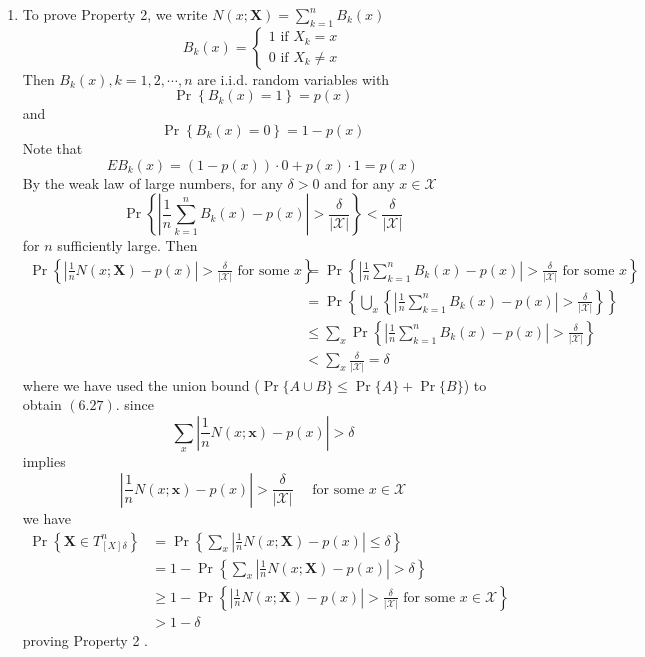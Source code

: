 \documentclass[8pt]{article}
\begin{document}
\begin{enumerate}
\item To prove Property 2, we write
$N(x ; \mathbf{X})=\sum_{k=1}^{n} B_{k}(x)$ 
$$B_{k}(x)=\left\{\begin{array}{l}1 \text { if } X_{k}=x \\ 0 \text { if } X_{k} \neq x\end{array}\right.$$
Then $B_{k}(x), k=1,2, \cdots, n$ are i.i.d. random variables with
$$
\operatorname{Pr}\left\{B_{k}(x)=1\right\}=p(x)
$$
and
$$
\operatorname{Pr}\left\{B_{k}(x)=0\right\}=1-p(x)
$$
Note that
$$
E B_{k}(x)=(1-p(x)) \cdot 0+p(x) \cdot 1=p(x)
$$
By the weak law of large numbers, for any $\delta>0$ and for any $x \in \mathcal{X}$
$$
\operatorname{Pr}\left\{\left|\frac{1}{n} \sum_{k=1}^{n} B_{k}(x)-p(x)\right|>\frac{\delta}{|\mathcal{X}|}\right\}<\frac{\delta}{|\mathcal{X}|}
$$
for $n$ sufficiently large. Then
$$
\begin{aligned}
	\operatorname{Pr}\left\{\left|\frac{1}{n} N(x ; \mathbf{X})-p(x)\right|>\frac{\delta}{|\mathcal{X}|} \text { for some } x\right\} 
	&=\operatorname{Pr}\left\{\left|\frac{1}{n} \sum_{k=1}^{n} B_{k}(x)-p(x)\right|>\frac{\delta}{|\mathcal{X}|} \text { for some } x\right\} \\
	&=\operatorname{Pr}\left\{\bigcup_{x}\left\{\left|\frac{1}{n} \sum_{k=1}^{n} B_{k}(x)-p(x)\right|>\frac{\delta}{|\mathcal{X}|}\right\}\right\} \\
	&\leq \sum_{x} \operatorname{Pr}\left\{\left|\frac{1}{n} \sum_{k=1}^{n} B_{k}(x)-p(x)\right|>\frac{\delta}{|\mathcal{X}|}\right\} \\
	&<\sum_{x} \frac{\delta}{|\mathcal{X}|} =\delta
\end{aligned}
$$
where we have used the union bound ($\operatorname{Pr}\{A \cup B\} \leq \operatorname{Pr}\{A\}+\operatorname{Pr}\{B\}$) to obtain $(6.27) .$ since
$$
\sum_{x}\left|\frac{1}{n} N(x ; \mathbf{x})-p(x)\right|>\delta
$$
implies
$$
\left|\frac{1}{n} N(x ; \mathbf{x})-p(x)\right|>\frac{\delta}{|\mathcal{X}|} \quad \text { for some } x \in \mathcal{X}
$$
we have
$$
\begin{aligned}
	\operatorname{Pr}\left\{\mathbf{X} \in T_{[X] \delta}^{n}\right\} 
	&=\operatorname{Pr}\left\{\sum_{x}\left|\frac{1}{n} N(x ; \mathbf{X})-p(x)\right| \leq \delta\right\} \\
	&=1-\operatorname{Pr}\left\{\sum_{x}\left|\frac{1}{n} N(x ; \mathbf{X})-p(x)\right|>\delta\right\} \\
	&\geq 1-\operatorname{Pr}\left\{\left|\frac{1}{n} N(x ; \mathbf{X})-p(x)\right|>\frac{\delta}{|\mathcal{X}|} \text { for some } x \in \mathcal{X}\right\} \\
	&>1-\delta
\end{aligned}
$$
proving Property 2 .


\end{enumerate}
\end{document}
